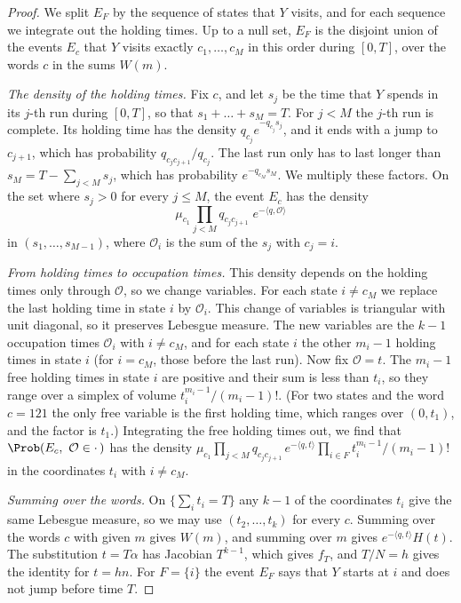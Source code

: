 \begin{proof}
We split $E_F$ by the sequence of states that $Y$ visits, and for each
sequence we integrate out the holding times. Up to a null set, $E_F$ is the
disjoint union of the events $E_c$ that $Y$ visits exactly $c_1,\dots,c_M$ in
this order during $[0,T]$, over the words $c$ in the sums $W(m)$.

\emph{The density of the holding times.} Fix $c$, and let $s_j$ be the time
that $Y$ spends in its $j$-th run during $[0,T]$, so that $s_1+\dots+s_M=T$.
For $j<M$ the $j$-th run is complete. Its holding time has the density
$q_{c_j}e^{-q_{c_j}s_j}$, and it ends with a jump to $c_{j+1}$, which has
probability $q_{c_jc_{j+1}}/q_{c_j}$. The last run only has to last longer
than $s_M=T-\sum_{j<M}s_j$, which has probability $e^{-q_{c_M}s_M}$. We
multiply these factors. On the set where $s_j>0$ for every $j\le M$, the event
$E_c$ has the density
\[
\mu_{c_1}\prod_{j<M}q_{c_jc_{j+1}}\;e^{-\langle q,\mathcal O\rangle}
\]
in $(s_1,\dots,s_{M-1})$, where $\mathcal O_i$ is the sum of the $s_j$ with
$c_j=i$.

\emph{From holding times to occupation times.} This density depends on the
holding times only through $\mathcal O$, so we change variables. For each state
$i\ne c_M$ we replace the last holding time in state $i$ by $\mathcal O_i$.
This change of variables is triangular with unit diagonal, so it preserves
Lebesgue measure. The new variables are the $k-1$ occupation times
$\mathcal O_i$ with $i\ne c_M$, and for each state $i$ the other $m_i-1$
holding times in state $i$ (for $i=c_M$, those before the last run). Now fix
$\mathcal O=t$. The $m_i-1$ free holding times in state $i$ are positive and
their sum is less than $t_i$, so they range over a simplex of volume
$t_i^{m_i-1}/(m_i-1)!$. (For two states and the word $c=121$ the only free
variable is the first holding time, which ranges over $(0,t_1)$, and the factor
is $t_1$.) Integrating the free holding times out, we find that
$\Prob(E_c,\ \mathcal O\in\cdot\,)$ has the density
$\mu_{c_1}\prod_{j<M}q_{c_jc_{j+1}}\,e^{-\langle q,t\rangle}
\prod_{i\in F}t_i^{m_i-1}/(m_i-1)!$ in the coordinates $t_i$ with $i\ne c_M$.

\emph{Summing over the words.} On $\{\sum_it_i=T\}$ any $k-1$ of the
coordinates $t_i$ give the same Lebesgue measure, so we may use
$(t_2,\dots,t_k)$ for every $c$. Summing over the words $c$ with given $m$
gives $W(m)$, and summing over $m$ gives $e^{-\langle q,t\rangle}H(t)$. The
substitution $t=T\alpha$ has Jacobian $T^{k-1}$, which gives $f_T$, and
$T/N=h$ gives the identity for $t=hn$. For $F=\{i\}$ the event $E_F$ says that
$Y$ starts at $i$ and does not jump before time $T$.
\end{proof}

